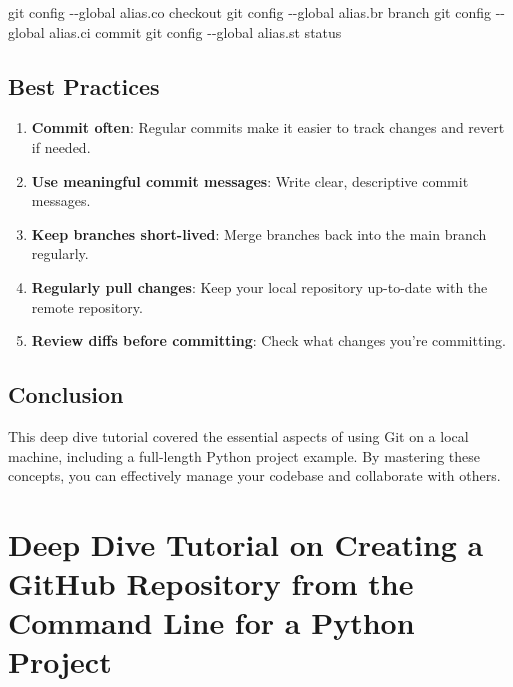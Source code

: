 \documentclass[
  letterpaper,
  DIV=11,
  numbers=noendperiod]{scrreprt}
\newenvironment{Shaded}{\begin{snugshade}}{\end{snugshade}}
\newcommand{\AttributeTok}[1]{\textcolor[rgb]{0.40,0.45,0.13}{#1}}
\newcommand{\FunctionTok}[1]{\textcolor[rgb]{0.28,0.35,0.67}{#1}}
\newcommand{\NormalTok}[1]{\textcolor[rgb]{0.00,0.23,0.31}{#1}}
\providecommand{\tightlist}{%
  \setlength{\itemsep}{0pt}\setlength{\parskip}{0pt}}\usepackage{longtable,booktabs,array}
\begin{document}
\begin{Shaded}
\begin{Highlighting}[]
\FunctionTok{git}\NormalTok{ config }\AttributeTok{{-}{-}global}\NormalTok{ alias.co checkout}
\FunctionTok{git}\NormalTok{ config }\AttributeTok{{-}{-}global}\NormalTok{ alias.br branch}
\FunctionTok{git}\NormalTok{ config }\AttributeTok{{-}{-}global}\NormalTok{ alias.ci commit}
\FunctionTok{git}\NormalTok{ config }\AttributeTok{{-}{-}global}\NormalTok{ alias.st status}
\end{Highlighting}
\end{Shaded}

\section{Best Practices}\label{best-practices-7}

\begin{enumerate}
\def\labelenumi{\arabic{enumi}.}
\tightlist
\item
  \textbf{Commit often}: Regular commits make it easier to track changes
  and revert if needed.
\item
  \textbf{Use meaningful commit messages}: Write clear, descriptive
  commit messages.
\item
  \textbf{Keep branches short-lived}: Merge branches back into the main
  branch regularly.
\item
  \textbf{Regularly pull changes}: Keep your local repository up-to-date
  with the remote repository.
\item
  \textbf{Review diffs before committing}: Check what changes you're
  committing.
\end{enumerate}

\section{Conclusion}\label{conclusion-46}

This deep dive tutorial covered the essential aspects of using Git on a
local machine, including a full-length Python project example. By
mastering these concepts, you can effectively manage your codebase and
collaborate with others.


\chapter{Deep Dive Tutorial on Creating a GitHub Repository from the
Command Line for a Python
Project}\label{deep-dive-tutorial-on-creating-a-github-repository-from-the-command-line-for-a-python-project}
\end{document}
